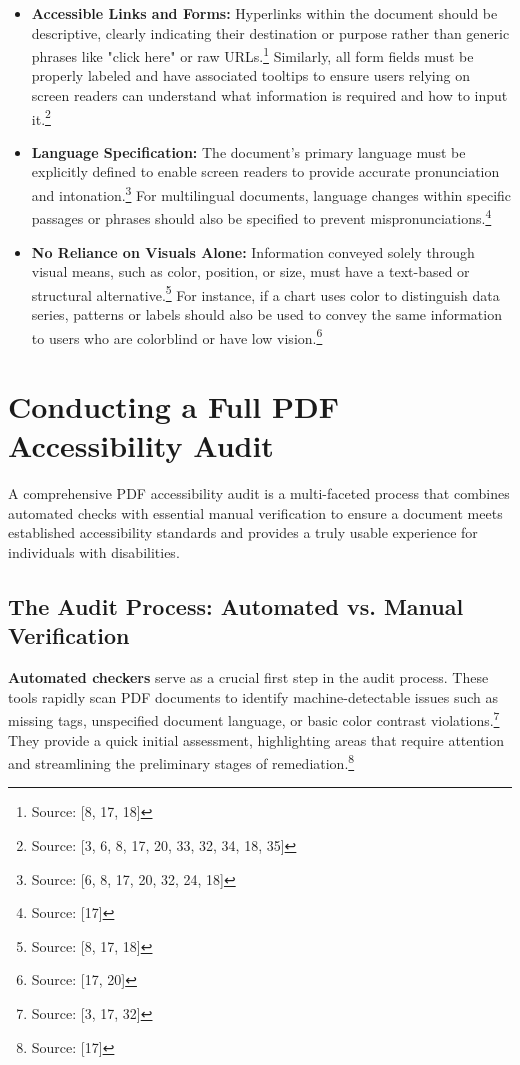 \begin{itemize}[noitemsep,topsep=0pt]
    \item \textbf{Accessible Links and Forms:} Hyperlinks within the document should be descriptive, clearly indicating their destination or purpose rather than generic phrases like "click here" or raw URLs.\footnote{Source: [8, 17, 18]} Similarly, all form fields must be properly labeled and have associated tooltips to ensure users relying on screen readers can understand what information is required and how to input it.\footnote{Source: [3, 6, 8, 17, 20, 33, 32, 34, 18, 35]}
    \item \textbf{Language Specification:} The document's primary language must be explicitly defined to enable screen readers to provide accurate pronunciation and intonation.\footnote{Source: [6, 8, 17, 20, 32, 24, 18]} For multilingual documents, language changes within specific passages or phrases should also be specified to prevent mispronunciations.\footnote{Source: [17]}
    \item \textbf{No Reliance on Visuals Alone:} Information conveyed solely through visual means, such as color, position, or size, must have a text-based or structural alternative.\footnote{Source: [8, 17, 18]} For instance, if a chart uses color to distinguish data series, patterns or labels should also be used to convey the same information to users who are colorblind or have low vision.\footnote{Source: [17, 20]}
\end{itemize}

\section{Conducting a Full PDF Accessibility Audit}

A comprehensive PDF accessibility audit is a multi-faceted process that combines automated checks with essential manual verification to ensure a document meets established accessibility standards and provides a truly usable experience for individuals with disabilities.

\subsection{The Audit Process: Automated vs. Manual Verification}

\textbf{Automated checkers} serve as a crucial first step in the audit process. These tools rapidly scan PDF documents to identify machine-detectable issues such as missing tags, unspecified document language, or basic color contrast violations.\footnote{Source: [3, 17, 32]} They provide a quick initial assessment, highlighting areas that require attention and streamlining the preliminary stages of remediation.\footnote{Source: [17]}


